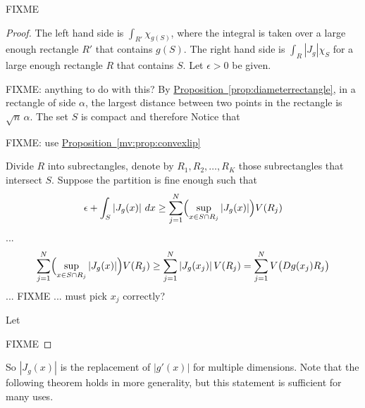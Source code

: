 \documentclass[12pt]{book}
\newcommand{\abs}[1]{\left\lvert {#1} \right\rvert}
\newcommand{\R}{{\mathbb{R}}}
\theoremstyle{plain}
\newtheorem{lemma}[thm]{Lemma}
\theoremstyle{remark}
\theoremstyle{definition}
\theoremstyle{exercise}
\theoremstyle{example}
\newcommand{\propref}[1]{\hyperref[#1]{Proposition~\ref*{#1}}}
\begin{document}

FIXME

\begin{proof}
The left hand side is $\int_{R'} \chi_{g(S)}$, where the integral is taken over a
large enough rectangle $R'$ that contains $g(S)$.
The right hand side is $\int_{R} \abs{J_g} \chi_S$ for
a large enough rectangle $R$ that contains $S$.  Let $\epsilon > 0$ be
given.

FIXME: anything to do with this?
By \propref{prop:diameterrectangle},
in a rectangle of side $\alpha$, the largest distance 
between two points in the rectangle is $\sqrt{n} \, \alpha$.
The set $S$ is compact and therefore 
Notice that 

FIXME: use
\propref{mv:prop:convexlip}





Divide $R$ into
subrectangles, denote
by $R_1,R_2,\ldots,R_K$ those subrectangles that intersect $S$.
Suppose the partition is fine enough such that
\begin{equation*}
\epsilon + \int_S \abs{J_g(x)} \, dx \geq
\sum_{j=1}^N \Bigl(\sup_{x \in S \cap R_j} \abs{J_g(x)} \Bigr) V(R_j)
\end{equation*}
...
\begin{equation*}
\sum_{j=1}^N \Bigl(\sup_{x \in S \cap R_j} \abs{J_g(x)} \Bigr) V(R_j)
\geq
\sum_{j=1}^N \abs{J_g(x_j)}  V(R_j)
=
\sum_{j=1}^N V\bigl(Dg(x_j) R_j\bigr)
\end{equation*}
... FIXME ... must pick $x_j$ correctly?




Let 






FIXME
\end{proof}

So $\abs{J_g(x)}$ is the replacement of $\abs{g'(x)}$ for multiple
dimensions.  Note that the following theorem holds in more generality,
but this statement is sufficient for many uses.
\end{document}
